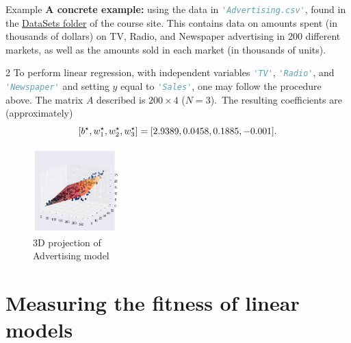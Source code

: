 \documentclass{beamer}
\theoremstyle{example}
\newcommand{\ct}[1]{\lstinline[language=Python,basicstyle=\ttfamily\footnotesize,stringstyle=\small\color{strings}]!#1!}
\begin{document}
\begin{frame}{Example}
    \textbf{A concrete example:} using the data in \ct{'Advertising.csv'}, found in the \href{https://github.com/cornwell/math371-S25/blob/main/DataSets/}{DataSets folder} of the course site. \newline 
    This contains data on amounts spent (in thousands of dollars) on TV, Radio, and Newspaper advertising in 200 different markets, as well as the amounts sold in each market (in thousands of units).
    
    \pause
    \begin{multicols}{2}
    To perform linear regression, with independent variables \ct{'TV'}, \ct{'Radio'}, and \ct{'Newspaper'} and setting $y$ equal to \ct{'Sales'}, one may follow the procedure above. The matrix $A$ described is $200\times 4$ ($N=3$).\pause\ The resulting coefficients are (approximately) \[{\scriptsize [b^\star, w_1^\star, w_2^\star, w_3^\star] = [2.9389, 0.0458, 0.1885, -0.001].}\]
    
    \begin{figure}[tight]
    \includegraphics[width=0.3\textwidth]{../../Images/multiregression-higherangle.png}
    \caption*{{\footnotesize 3D projection of\\ Advertising model}}
    \end{figure}
    \end{multicols}
\end{frame}

\section{Measuring the fitness of linear models}
\end{document}

